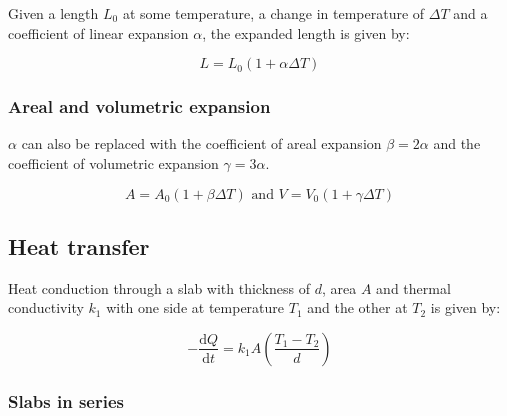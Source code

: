 \documentclass[12pt]{article}
\begin{document}
Given a length $L_0$ at some temperature, a change in temperature of $\Delta T$ and a coefficient of linear expansion $\alpha$, the expanded length is given by:

\[
\boxed{
L = L_0(1+\alpha \Delta T)
}
\]

\subsubsection{Areal and volumetric expansion}

$\alpha$ can also be replaced with the coefficient of areal expansion $\beta=2\alpha$ and the coefficient of volumetric expansion $\gamma=3\alpha$.

\[
\boxed{A = A_0(1+\beta \Delta T)} \text{ and } \boxed{V = V_0(1 + \gamma \Delta T)}
\]

\subsection{Heat transfer}

Heat conduction through a slab with thickness of $d$, area $A$ and thermal conductivity $k_1$ with one side at temperature $T_1$ and the other at $T_2$ is given by:

\[
\boxed{
-\frac{\mathrm{d}Q}{\mathrm{d}t} = k_1 A \left(\frac{T_1 - T_2}{d}\right)
}
\]

\subsubsection{Slabs in series}
\end{document}
